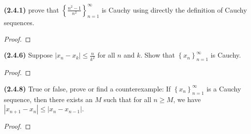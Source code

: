 \documentclass[12pt]{article}
\newcommand{\abs}[1]{\left| {#1} \right|}
\newcommand{\seq}[2][n]{\left\{ {#2} \right\}_{#1=1}^\infty}
\begin{document}
\newpage

\noindent \textbf{(2.4.1)} prove that $\seq{\frac{n^2-1}{n^2}}$ is Cauchy using directly the definition of Cauchy sequences.

\begin{proof}
	\lipsum[1]
\end{proof}

\newpage

\noindent \textbf{(2.4.6)} Suppose $\abs{x_n-x_k}\le\frac{n}{k^2}$ for all $n$ and $k$. Show that $\seq{x_n}$ is Cauchy.

\begin{proof}
	\lipsum[1]
\end{proof}

\newpage

\noindent \textbf{(2.4.8)} True or false, prove or find a counterexample: If $\seq{x_n}$ is a Cauchy sequence, then there exists an $M$ such that for all $n\ge M$, we have $\abs{x_{n+1}-x_n}\le\abs{x_n-x_{n-1}}$.

\begin{proof}
	\lipsum[1]
\end{proof}
\end{document}
